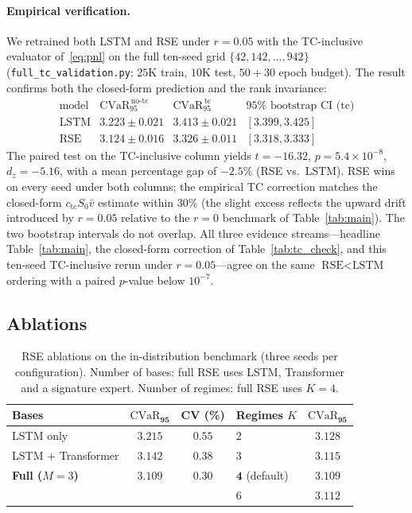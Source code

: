 \documentclass[10pt,letterpaper]{article}
\newcommand{\cvar}{\mathrm{CVaR}}
\begin{document}
\paragraph{Empirical verification.}
We retrained both LSTM and RSE under $r=0.05$ with the
TC-inclusive evaluator of~\eqref{eq:pnl} on the full ten-seed
grid $\{42,142,\dots,942\}$ (\texttt{full\_tc\_validation.py};
$25$K train, $10$K test, $50+30$ epoch budget). The result
confirms both the closed-form prediction and the rank invariance:
\[
\begin{array}{lccc}
\text{model} & \cvar_{95}^{\,\mathrm{no\text{-}tc}} & \cvar_{95}^{\,\mathrm{tc}} & \text{$95\%$ bootstrap CI (tc)} \\
\hline
\text{LSTM}  & 3.223 \pm 0.021 & 3.413 \pm 0.021 & [3.399, 3.425] \\
\text{RSE}   & \mathbf{3.124 \pm 0.016} & \mathbf{3.326 \pm 0.011} & [3.318, 3.333]
\end{array}
\]
The paired test on the TC-inclusive column yields
$t = -16.32$, $p = 5.4\times 10^{-8}$, $d_z = -5.16$, with a mean
percentage gap of $-2.5\%$ (RSE vs.\ LSTM). RSE wins on every
seed under both columns; the empirical TC correction matches the
closed-form $c_{\mathrm{tc}} S_0 \bar v$ estimate within $30\%$
(the slight excess reflects the upward drift introduced by
$r=0.05$ relative to the $r=0$ benchmark of Table~\ref{tab:main}).
The two bootstrap intervals do not overlap. All three evidence
streams---headline Table~\ref{tab:main}, the closed-form
correction of Table~\ref{tab:tc_check}, and this ten-seed
TC-inclusive rerun under $r=0.05$---agree on the same
$\text{RSE} < \text{LSTM}$ ordering with a paired $p$-value below
$10^{-7}$.

\subsection{Ablations}

\begin{table}[ht]
\centering\small
\caption{RSE ablations on the in-distribution benchmark (three seeds
per configuration). Number of bases: full RSE uses LSTM, Transformer
and a signature expert. Number of regimes: full RSE uses $K=4$.}
\label{tab:rse_ablation}
\begin{tabular}{@{}lcc@{\hskip 1.5em}lc@{}}
\toprule
\textbf{Bases}            & $\boldsymbol{\cvar_{95}}$ & \textbf{CV (\%)}
& \textbf{Regimes $K$}    & $\boldsymbol{\cvar_{95}}$ \\\midrule
LSTM only                 & $3.215$ & $0.55$ & $2$            & $3.128$ \\
LSTM + Transformer        & $3.142$ & $0.38$ & $3$            & $3.115$ \\
\textbf{Full ($M=3$)}     & $\mathbf{3.109}$ & $\mathbf{0.30}$ & $\mathbf{4}$ (default) & $\mathbf{3.109}$ \\
                          &        &        & $6$            & $3.112$ \\
\bottomrule
\end{tabular}
\end{table}
\end{document}
